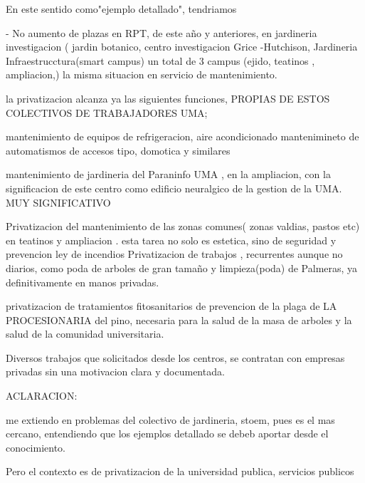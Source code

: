 \begin{itemize}[leftmargin=*, labelsep=0.6em, itemsep=0.8em]
{{{{{{{En este sentido como"ejemplo detallado", tendriamos

- No  aumento de plazas en RPT, de este año y anteriores, en jardineria investigacion ( jardin botanico, centro investigacion Grice -Hutchison, Jardineria Infraestrucctura(smart campus) un total de 3 campus (ejido, teatinos , ampliacion,)  la misma situacion en servicio de mantenimiento.

la privatizacion alcanza ya las siguientes funciones, PROPIAS DE ESTOS COLECTIVOS DE TRABAJADORES UMA;

 mantenimiento de equipos de refrigeracion, aire acondicionado
mantenimineto de automatismos de accesos tipo, domotica y similares

mantenimiento de jardineria del Paraninfo UMA  , en la ampliacion, con la significacion de este centro como  edificio neuralgico de la gestion de la UMA. MUY SIGNIFICATIVO

Privatizacion del mantenimiento de las zonas comunes( zonas valdias, pastos etc) en teatinos y ampliacion . esta  tarea no solo es estetica, sino de seguridad y prevencion ley de incendios
Privatizacion de trabajos , recurrentes aunque no diarios, como poda de arboles de gran tamaño y limpieza(poda) de Palmeras, ya definitivamente en manos privadas.

privatizacion de tratamientos fitosanitarios de prevencion de la plaga de LA PROCESIONARIA del pino, necesaria para la salud de la masa de arboles y la salud de la comunidad universitaria.

Diversos trabajos que solicitados desde los centros, se contratan con empresas privadas sin una motivacion clara y documentada.




ACLARACION:

me extiendo en problemas del colectivo de jardineria, stoem, pues es el mas cercano, entendiendo que los ejemplos detallado  se debeb aportar desde el conocimiento.

Pero el contexto es de privatizacion de la universidad publica, servicios publicos}



}}}}}}
\end{itemize}
